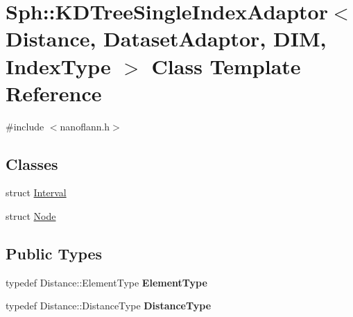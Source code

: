 \hypertarget{classSph_1_1KDTreeSingleIndexAdaptor}{}\section{Sph\+:\+:K\+D\+Tree\+Single\+Index\+Adaptor$<$ Distance, Dataset\+Adaptor, D\+IM, Index\+Type $>$ Class Template Reference}
\label{classSph_1_1KDTreeSingleIndexAdaptor}


{\ttfamily \#include $<$nanoflann.\+h$>$}

\subsection*{Classes}
\begin{DoxyCompactItemize}
\item 
struct \hyperlink{structSph_1_1KDTreeSingleIndexAdaptor_1_1Interval}{Interval}
\item 
struct \hyperlink{structSph_1_1KDTreeSingleIndexAdaptor_1_1Node}{Node}
\end{DoxyCompactItemize}
\subsection*{Public Types}
\begin{DoxyCompactItemize}
\item 
\hypertarget{classSph_1_1KDTreeSingleIndexAdaptor_ad953c11780c30bd9792ebef15777e4db}{}\label{classSph_1_1KDTreeSingleIndexAdaptor_ad953c11780c30bd9792ebef15777e4db} 
typedef Distance\+::\+Element\+Type {\bfseries Element\+Type}
\item 
\hypertarget{classSph_1_1KDTreeSingleIndexAdaptor_adaa73c70fe7b5a7087330090107cafba}{}\label{classSph_1_1KDTreeSingleIndexAdaptor_adaa73c70fe7b5a7087330090107cafba} 
typedef Distance\+::\+Distance\+Type {\bfseries Distance\+Type}
\end{DoxyCompactItemize}
